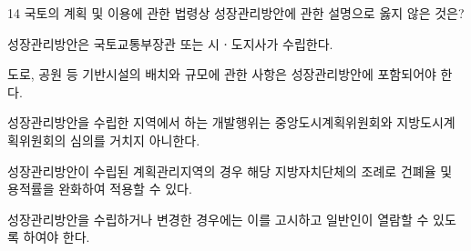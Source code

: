 \begin{question}{14}
국토의 계획 및 이용에 관한 법령상 성장관리방안에 관한 설명으로 옳지 않은 것은?
\begin{choices}
  \item 성장관리방안은 국토교통부장관 또는 시ㆍ도지사가 수립한다.
  \item 도로, 공원 등 기반시설의 배치와 규모에 관한 사항은 성장관리방안에 포함되어야 한다.
  \item 성장관리방안을 수립한 지역에서 하는 개발행위는 중앙도시계획위원회와 지방도시계획위원회의 심의를 거치지 아니한다.
  \item 성장관리방안이 수립된 계획관리지역의 경우 해당 지방자치단체의 조례로 건폐율 및 용적률을 완화하여 적용할 수 있다.
  \item 성장관리방안을 수립하거나 변경한 경우에는 이를 고시하고 일반인이 열람할 수 있도록 하여야 한다.
\end{choices}
\end{question}

